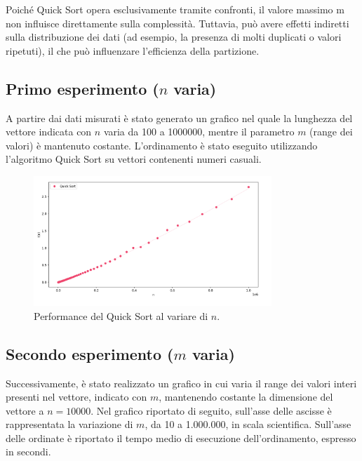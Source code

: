 \documentclass[a4paper, 12pt, oneside]{book}
\begin{document}
\noindent
Poiché Quick Sort opera esclusivamente tramite confronti, il valore massimo m non influisce direttamente sulla complessità. Tuttavia, può avere effetti indiretti sulla distribuzione dei dati (ad esempio, la presenza di molti duplicati o valori ripetuti), il che può influenzare l'efficienza della partizione. \\

\subsection{Primo esperimento ($n$ varia)}

A partire dai dati misurati è stato generato un grafico nel quale la lunghezza del vettore indicata con \(n\) varia da 100 a 1000000, mentre il parametro \(m\) (range dei valori) è mantenuto costante. L'ordinamento è stato eseguito utilizzando l'algoritmo Quick Sort su vettori contenenti numeri casuali.

\begin{figure}[H]
    \centering
    \includegraphics[width=0.8\textwidth]{images/grafico_quick_sort_n.png}
    \caption{Performance del Quick Sort al variare di \(n\).}
    \label{fig:quick_sort_n}
\end{figure}

\subsection{Secondo esperimento ($m$ varia)}

\noindent Successivamente, è stato realizzato un grafico in cui varia il range dei valori interi presenti nel vettore, indicato con \(m\), mantenendo costante la dimensione del vettore a \(n=10000\). Nel grafico riportato di seguito, sull'asse delle ascisse è rappresentata la variazione di \(m\), da 10 a 1.000.000, in scala scientifica. Sull'asse delle ordinate è riportato il tempo medio di esecuzione dell'ordinamento, espresso in secondi.
\end{document}
